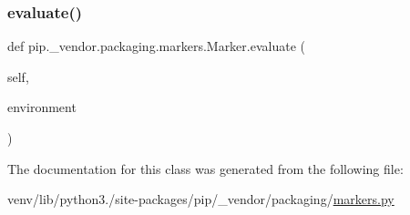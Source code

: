 \subsubsection{\texorpdfstring{evaluate()}{evaluate()}}
{\footnotesize\ttfamily def pip.\+\_\+vendor.\+packaging.\+markers.\+Marker.\+evaluate (\begin{DoxyParamCaption}\item[{}]{self,  }\item[{}]{environment }\end{DoxyParamCaption})}



The documentation for this class was generated from the following file\+:\begin{DoxyCompactItemize}
\item 
venv/lib/python3./site-\/packages/pip/\+\_\+vendor/packaging/\hyperlink{pip_2__vendor_2packaging_2markers_8py}{markers.\+py}\end{DoxyCompactItemize}
